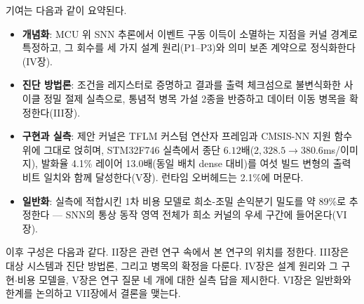 기여는 다음과 같이 요약된다.
\begin{itemize}
\item \textbf{개념화}: MCU 위 SNN 추론에서 이벤트 구동 이득이
  소멸하는 지점을 커널 경계로 특정하고, 그 회수를 세 가지 설계
  원리(P1--P3)와 의미 보존 계약으로 정식화한다(IV장).
\item \textbf{진단 방법론}: 조건을 레지스터로 증명하고 결과를 출력
  체크섬으로 불변식화한 사이클 정밀 절제 실측으로, 통념적 병목
  가설 2종을 반증하고 데이터 이동 병목을 확정한다(III장).
\item \textbf{구현과 실측}: 제안 커널은 TFLM 커스텀 연산자 프레임과
  CMSIS-NN 지원 함수 위에 그대로 얹히며, STM32F746 실측에서 종단
  $6.12$배($2{,}328.5\rightarrow380.6$ms/이미지), 발화율 4.1\%
  레이어 13.0배(동일 배치 dense 대비)를 여섯 빌드 변형의 출력 비트
  일치와 함께 달성한다(V장).
  런타임 오버헤드는 2.1\%에 머문다.
\item \textbf{일반화}: 실측에 적합시킨 1차 비용 모델로 희소-조밀
  손익분기 밀도를 약 89\%로 추정한다 --- SNN의 통상 동작 영역
  전체가 희소 커널의 우세 구간에 들어온다(VI장).
\end{itemize}

이후 구성은 다음과 같다. II장은 관련 연구 속에서 본 연구의 위치를
정한다. III장은 대상 시스템과 진단 방법론, 그리고 병목의 확정을
다룬다. IV장은 설계 원리와 그 구현$\cdot$비용 모델을, V장은 연구
질문 네 개에 대한 실측 답을 제시한다. VI장은 일반화와 한계를
논의하고 VII장에서 결론을 맺는다.
